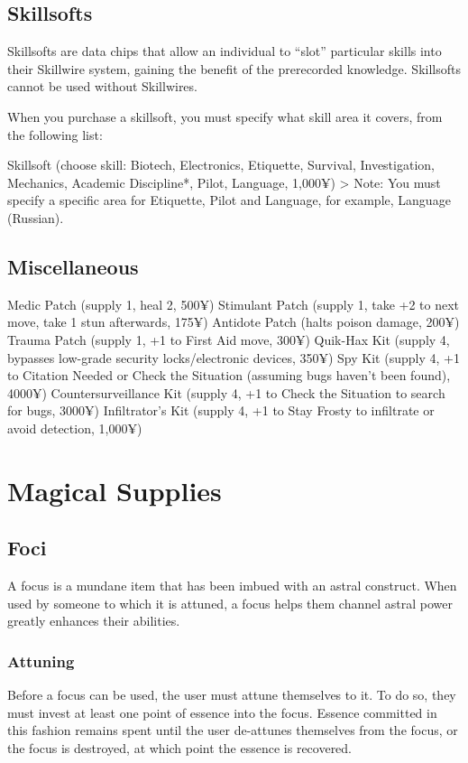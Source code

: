 \subsection{Skillsofts}

Skillsofts are data chips that allow an individual to “slot” particular skills into their Skillwire system, gaining the benefit of the prerecorded knowledge. Skillsofts cannot be used without Skillwires.

When you purchase a skillsoft, you must specify what skill area it covers, from the following list:

Skillsoft (choose skill: Biotech, Electronics, Etiquette, Survival, Investigation, Mechanics, Academic Discipline*, Pilot, Language, 1,000¥) > Note: You must specify a specific area for Etiquette, Pilot and Language, for example, Language (Russian).


\subsection{Miscellaneous}

Medic Patch (supply 1, heal 2, 500¥)
Stimulant Patch (supply 1, take +2 to next move, take 1 stun afterwards, 175¥)
Antidote Patch (halts poison damage, 200¥)
Trauma Patch (supply 1, +1 to First Aid move, 300¥)
Quik-Hax Kit (supply 4, bypasses low-grade security locks/electronic devices, 350¥)
Spy Kit (supply 4, +1 to Citation Needed or Check the Situation (assuming bugs haven’t been found), 4000¥)
Countersurveillance Kit (supply 4, +1 to Check the Situation to search for bugs, 3000¥)
Infiltrator’s Kit (supply 4, +1 to Stay Frosty to infiltrate or avoid detection, 1,000¥)



\section{Magical Supplies}

\subsection{Foci}

A focus is a mundane item that has been imbued with an astral construct. When used by someone to which it is attuned, a focus helps them channel astral power greatly enhances their abilities.

\subsubsection{Attuning}
Before a focus can be used, the user must attune themselves to it. To do so, they must invest at least one point of essence into the focus. Essence committed in this fashion remains spent until the user de-attunes themselves from the focus, or the focus is destroyed, at which point the essence is recovered.

